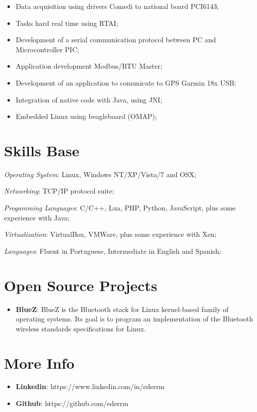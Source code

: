 \documentclass[margin]{eder}
\begin{document}
\begin{resume}
\begin{itemize}
  \item Data acquisition using drivers Comedi to national board PCI6143;
  \item Tasks hard real time using RTAI;
  \item Development of a serial communication protocol between PC and Microcontroller PIC;
  \item Application development Modbus/RTU Master;
  \item Development of an application to comunicate to GPS Garmin 18x USB;
  \item Integration of native code with Java, using JNI;
  \item Embedded Linux using beagleboard (OMAP);
\end{itemize}

\section{Skills Base} 

  \textit{Operating System}: Linux, Windows NT/XP/Vista/7 and OSX;

	\textit{Networking}: TCP/IP protocol suite;
  
	\textit{Progamming Languages}: C/C++, Lua, PHP, Python, JavaScript, plus some experience with Java;
  
	\textit{Virtualization}: VirtualBox, VMWare, plus some experience with Xen;

	\textit{Languages}: Fluent in Portuguese, Intermediate in English and Spanish;
 
\section{Open Source Projects}
	\begin{itemize}
		\vspace{2mm}

		\item \textbf{BlueZ}: BlueZ is the Bluetooth stack for Linux kernel-based family of operating systems. Its goal is to program an implementation of the Bluetooth wireless standards specifications for Linux. 

	\end{itemize}
 
\section{More Info}
    \begin{itemize}
        \item \textbf{Linkedin}: https://www.linkedin.com/in/ederrm
         \item \textbf{Github}: https://github.com/ederrm
    \end{itemize}

\end{resume} 
\end{document}
